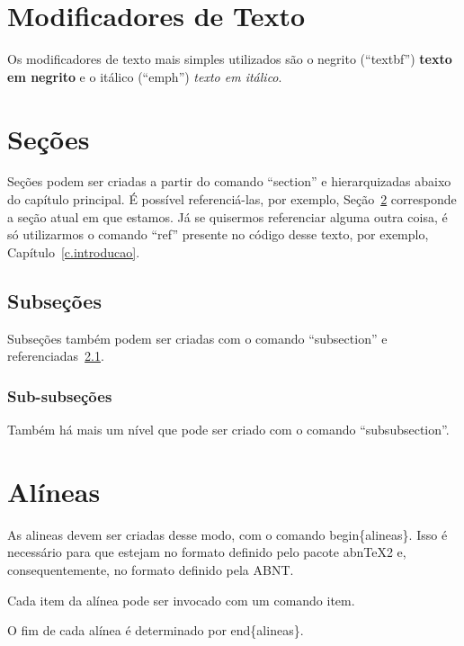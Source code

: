 \section{Modificadores de Texto}
\label{s.modificador}

Os modificadores de texto mais simples utilizados são o negrito (``textbf'') \textbf{texto em negrito} e o itálico (``emph'') \emph{texto em itálico}.

\section{Seções}
\label{s.citacoes}

Seções podem ser criadas a partir do comando ``section'' e hierarquizadas abaixo do capítulo principal. É possível referenciá-las, por exemplo, Seção~\ref{s.citacoes} corresponde a seção atual em que estamos. Já se quisermos referenciar alguma outra coisa, é só utilizarmos o comando ``ref'' presente no código desse texto, por exemplo, Capítulo~\ref{c.introducao}.

\subsection{Subseções}
\label{ss.subsecao}

Subseções também podem ser criadas com o comando ``subsection'' e referenciadas~\ref{ss.subsecao}.

\subsubsection{Sub-subseções}
\label{sss.subsubsecao}

Também há mais um nível que pode ser criado com o comando ``subsubsection''.

\section{Alíneas}
\label{s.alineas}

\begin{alineas}
	
	\item As alineas devem ser criadas desse modo, com o comando begin\{alineas\}. Isso é necessário para que estejam no formato definido pelo pacote abnTeX2 e, consequentemente, no formato definido pela ABNT.
	
	\item Cada item da alínea pode ser invocado com um comando item.
	
	\item O fim de cada alínea é determinado por end\{alineas\}.
	
\end{alineas}

